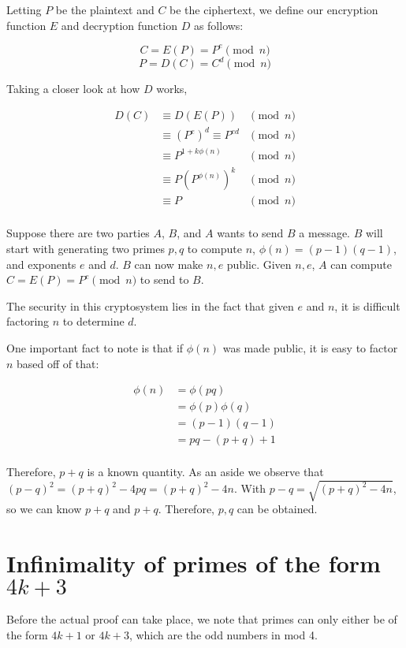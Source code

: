 \documentclass{article}
\begin{document}
\begin{multicols*}{2}
Letting $P$ be the plaintext and $C$ be the ciphertext, we define our encryption function $E$ and decryption function $D$ as follows:

\[ C = E(P) = P^e \pmod{n} \]
\[ P = D(C) = C^d \pmod{n} \]

Taking a closer look at how $D$ works,

\[
\begin{aligned}
D(C) &\equiv D(E(P)) &\pmod{n} \\
&\equiv (P^e)^d \equiv P^{ed} &\pmod{n}\\
&\equiv P^{1 + k\phi(n)} &\pmod{n}\\
&\equiv P(P^{\phi(n)})^k &\pmod{n}\\
&\equiv P &\pmod{n}\\
\end{aligned}
\]

Suppose there are two parties $A$, $B$, and $A$ wants to send $B$ a message. $B$ will start with generating two primes $p, q$ to compute $n$, $\phi(n) = (p-1)(q-1)$, and exponents $e$ and $d$. $B$ can now make $n, e$ public. Given $n, e$, $A$ can compute $C = E(P) = P^e \pmod{n}$ to send to $B$.

The security in this cryptosystem lies in the fact that given $e$ and $n$, it is difficult factoring $n$ to determine $d$.

One important fact to note is that if $\phi(n)$ was made public, it is easy to factor $n$ based off of that:

\[
\begin{aligned}
\phi(n) &= \phi(pq) \\
&= \phi(p)\phi(q) \\
&= (p-1)(q-1) \\
&= pq - (p+q) + 1 \\
\end{aligned}
\]

Therefore, $p+q$ is a known quantity. As an aside we observe that $(p-q)^2 = (p+q)^2 - 4pq = (p+q)^2 - 4n$. With $p - q = \sqrt{(p+q)^2 - 4n}$, so we can know $p + q$ and $p + q$. Therefore, $p, q$ can be obtained.

\newpage

\section{Infinimality of primes of the form $4k+3$}

Before the actual proof can take place, we note that primes can only either be of the form $4k+1$ or $4k+3$, which are the odd numbers in mod 4.


\end{multicols*}
\end{document}
